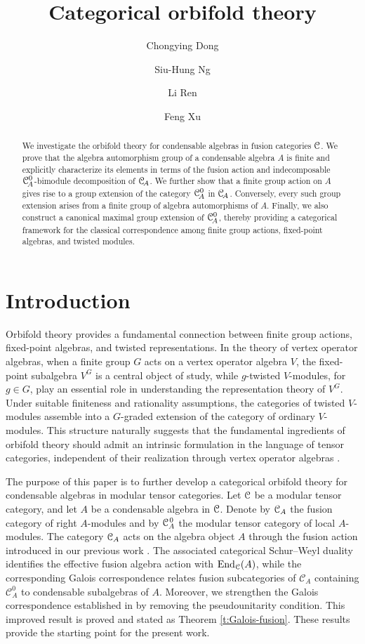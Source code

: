 \documentclass{amsart}
\title{Categorical orbifold theory}
\author{Chongying Dong}
\author{Siu-Hung Ng}
\author{Li Ren}
\author{Feng Xu}
\begin{document}
\begin{abstract}
We investigate the orbifold theory for condensable algebras in fusion
categories $\EuScript{C}$. We prove that the algebra automorphism group of a condensable
algebra $A$ is finite and explicitly characterize its elements in terms
of the fusion action and indecomposable
$\EuScript{C}_{\!A}^0$-bimodule decomposition of $\EuScript{C}_{\!A}$.
We further show that a finite group action on $A$ gives rise to a group
extension of the category $\EuScript{C}_{\!A}^0$ in $\EuScript{C}_{\!A}$.
Conversely, every such group extension arises from a finite group of
algebra automorphisms of $A$. Finally, we also construct a canonical
maximal group extension of $\EuScript{C}_{\!A}^0$, thereby providing a
categorical framework for the classical correspondence among finite
group actions, fixed-point algebras, and twisted modules.
\end{abstract}
\maketitle

\section{Introduction}

Orbifold theory provides a fundamental connection between finite group actions, fixed-point algebras, and twisted representations. In the theory of vertex operator algebras, when a finite group $G$ acts on a vertex operator algebra $V$, the fixed-point subalgebra $V^G$ is a central object of study, while $g$-twisted $V$-modules, for $g\in G$, play an essential role in understanding the representation theory of $V^G$. Under suitable finiteness and rationality assumptions, the categories of twisted $V$-modules assemble into a $G$-graded extension of the category of ordinary $V$-modules. This structure naturally suggests that the fundamental ingredients of orbifold theory should admit an intrinsic formulation in the language of tensor categories, independent of their realization through vertex operator algebras \cite{Ki2002, Ki3, McRae2021}.

The purpose of this paper is to further develop a categorical orbifold theory for condensable algebras in modular tensor categories. Let ${\EuScript{C}}$ be a modular tensor category, and let $A$ be a condensable algebra in ${\EuScript{C}}$. Denote by ${{\EuScript{C}}_A}$ the fusion category of right $A$-modules and by ${{\EuScript{C}}_A^{\hspace{1pt}0}}$ the modular tensor category of local $A$-modules. The category ${{\EuScript{C}}_A}$ acts on the algebra object $A$ through the fusion action introduced in our previous work \cite{DNR2025}. The associated categorical Schur--Weyl duality identifies the effective fusion algebra action with $\operatorname{End}_{{\EuScript{C}}}(A)$, while the corresponding Galois correspondence relates fusion subcategories of $\mathcal{C}_A$ containing $\mathcal{C}_A^0$ to condensable subalgebras of $A$.  Moreover, we strengthen the Galois correspondence established in \cite{DNR2025}
by removing the pseudounitarity condition. This improved result is proved and stated as Theorem  \ref{t:Galois-fusion}. These results provide the starting point for the present work. 
\end{document}
